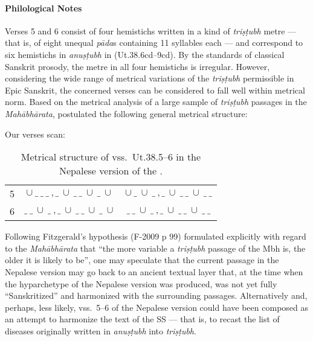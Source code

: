 \paragraph*{Philological Notes}
Verses 5 and 6 consist of four hemistichs written in a kind of \textit{triṣṭubh} metre --- that is, of eight unequal \textit{pāda}s containing 11 syllables each --- and correspond to six hemistichs in \textit{anuṣṭubh} in \cite{vulgate} (Ut.38.6cd--9cd).
By the standards of classical Sanskrit prosody, the metre in all four hemistichs is irregular. However, considering the wide range of metrical variations of the \textit{triṣṭubh} permissible in Epic Sanskrit, the concerned verses can be considered to fall well within metrical norm. Based on the metrical analysis of a large sample of \textit{triṣṭubh} passages in the \textit{Mahābhārata}, \textcite[108]{fitz-2009} postulated the following general metrical structure: 

\begin{table}[h!]
\centering
\caption{\small Summary of table 3 in \cite{fitz-2009}.}
\end{table}

Our verses scan:

\begin{table}[h!]
\centering
\caption{\small Metrical structure of vss.\ Ut.38.5--6 in the Nepalese version of the \SS.}
\begin{tabular}{ c || c | c }
 5 & $\cup\ \_\ \_\ \_\ , \_\ \cup\ \_\ \_\ \cup\ \_\ \cup$ & $\cup\ \_\ \cup\ \_\ , \_\ \cup\  \_\ \_\ \cup\ \_\ \_$ \\ 
 6 & $\_\ \_\ \cup\ \_\ , \_\ \cup\ \_\ \_\ \cup\ \_\ \cup$ & $\_\ \_\ \cup\ \_\ , \_\ \cup\ \_\ \_\ \cup\ \_\ \_$     
\end{tabular}
\end{table}

Following Fitzgerald's hypothesis (F-2009 p 99) formulated explicitly with regard to the \textit{Mahābhārata} that ``the more variable a \textit{triṣṭubh} passage of the Mbh is, the older it is likely to be'', one may speculate that the current passage in the Nepalese version may go back to an ancient textual layer that, at the time when the hyparchetype of the Nepalese version was produced, was not yet fully ``Sanskritized'' and harmonized with the surrounding passages. 
Alternatively and, perhaps, less likely, vss.\ 5--6 of the Nepalese version could have been composed as an attempt to harmonize the text of the SS --- that is, to recast the list of diseases originally written in \textit{anuṣṭubh} into \textit{triṣṭubh}. %

